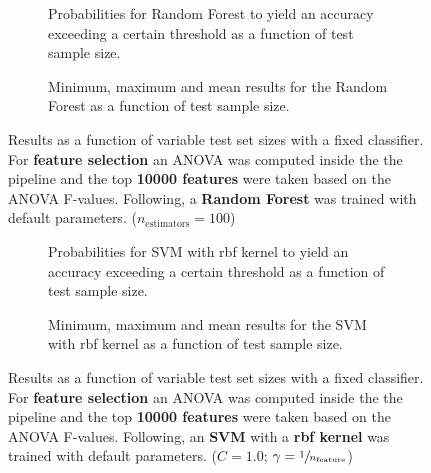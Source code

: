 \begin{figure}
    \captionsetup[subfigure]{justification=justified,singlelinecheck=false}
    \begin{subfigure}[t]{0.61\textwidth}
        
        \caption{Probabilities for Random Forest to yield an accuracy exceeding a certain threshold as a function of test sample size.}
    \end{subfigure}
    \hspace{3.0mm}
    \begin{subfigure}[t]{0.34\textwidth}
        
        \caption{Minimum, maximum and mean results for the Random Forest as a function of test sample size.}
    \end{subfigure}
    \caption[Effects of varying test sample size. Random Forest; Preprocessing: ANOVA feature selection ($k_\text{best} = \num{10000}$)]{Results as a function of variable test set sizes with a fixed classifier. For \textbf{feature selection} an ANOVA was computed inside the the pipeline and the top \textbf{\num{10000} features} were taken based on the ANOVA F-values. Following, a \textbf{{Random Forest}} was trained with default parameters. ($n_\text{estimators}=\num{100}$)}
    \label{fig:no_PCA_10000_best_selected_RandomForest}
\end{figure}

\begin{figure}
    \captionsetup[subfigure]{justification=justified,singlelinecheck=false}
    \begin{subfigure}[t]{0.61\textwidth}
        
        \caption{Probabilities for SVM with rbf kernel to yield an accuracy exceeding a certain threshold as a function of test sample size.}
    \end{subfigure}
    \hspace{3.0mm}
    \begin{subfigure}[t]{0.34\textwidth}
        
        \caption{Minimum, maximum and mean results for the SVM with rbf kernel as a function of test sample size.}
    \end{subfigure}
    \caption[Effects of varying test sample size. SVM (kernel = rbf); Preprocessing: ANOVA feature selection ($k_\text{best} = \num{10000}$)]{Results as a function of variable test set sizes with a fixed classifier. For \textbf{feature selection} an ANOVA was computed inside the the pipeline and the top \textbf{\num{10000} features} were taken based on the ANOVA F-values. Following, an \textbf{{SVM}} with a \textbf{{rbf kernel}} was trained with default parameters. ($C=\num{1.0}$; $\gamma=\sfrac{1}{n_\text{feature}}$)}
    \label{fig:no_PCA_10000_best_selected_SVC}
\end{figure}

